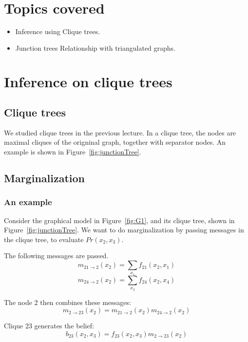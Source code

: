 \documentclass[12pt]{report}
\begin{document}

\maketitle

\section{Topics covered}
\begin{itemize}
 \item Inference using Clique trees.
 \item Junction trees
 \subitem Relationship with triangulated graphs.
\end{itemize}


\section{Inference on clique trees}
\subsection{Clique trees}
We studied clique trees in the previous lecture. In a clique tree, the nodes are maximal cliques of the origninal graph, together with separator nodes. An example is shown in Figure~\ref{fig:junctionTree}.

\subsection{Marginalization}
\subsubsection{An example}
Consider the graphical model in Figure~\ref{fig:G1}, and its clique tree, shown in Figure~\ref{fig:junctionTree}. We want to do marginalization by passing messages in the clique tree, to evaluate $Pr(x_2, x_3)$.

The following messages are passed.
$$m_{21 \to 2}(x_2) = \sum_{x_1}f_{21}(x_2, x_1)$$
$$m_{24 \to 2}(x_2) = \sum_{x_2}f_{24}(x_2, x_4)$$

The node 2 then combines these messages:
$$m_{2 \to 23}(x_2) = m_{21 \to 2}(x_2)m_{24 \to 2}(x_2)$$

Clique 23 generates the belief:
$$b_{23}(x_2, x_3) = f_{23}(x_2, x_3)m_{2 \to 23}(x_2)$$
\end{document}
